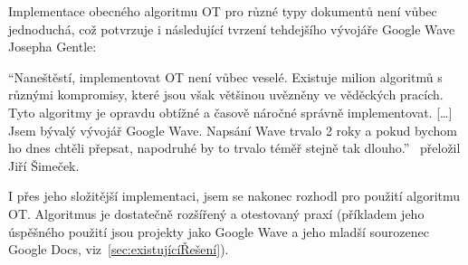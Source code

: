 Implementace obecného algoritmu \gls{OT} pro různé typy dokumentů není vůbec jednoduchá, což potvrzuje i následující tvrzení tehdejšího vývojáře Google Wave Josepha Gentle:

\enquote{Naneštěstí, implementovat OT není vůbec veselé.
Existuje milion algoritmů s různými kompromisy, které jsou však většinou uvězněny ve věděckých pracích.
Tyto algoritmy je opravdu obtížné a časově náročné správně implementovat.
[\ldots]
Jsem bývalý vývojář Google Wave.
Napsání Wave trvalo 2 roky a pokud bychom ho dnes chtěli přepsat, napodruhé by to trvalo téměř stejně tak dlouho.}~\cite{ot:sharejs} přeložil Jiří Šimeček.

I přes jeho složitější implementaci, jsem se nakonec rozhodl pro použití algoritmu \gls{OT}.
Algoritmus je dostatečně rozšířený a otestovaný praxí (příkladem jeho úspěšného použití jsou projekty jako Google Wave a jeho mladší sourozenec Google Docs, viz~\ref{sec:existujícíŘešení}).
